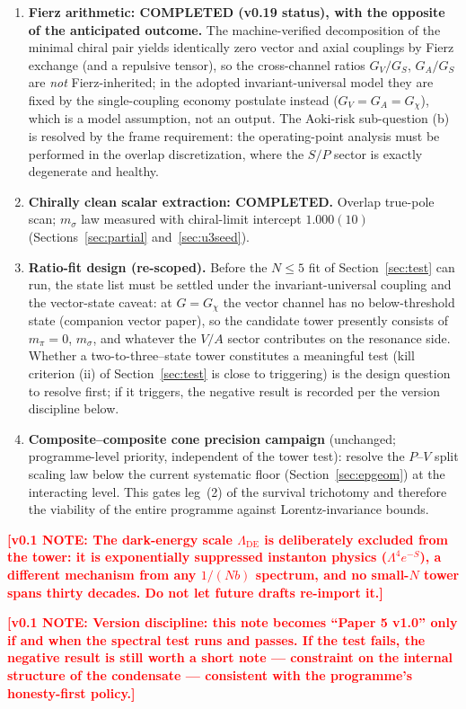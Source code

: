 \documentclass[11pt,a4paper]{article}
\newcommand{\workingnote}[1]{\textcolor{red}{\textbf{[v0.1 NOTE: #1]}}}
\begin{document}
\begin{enumerate}
\item \textbf{Fierz arithmetic: COMPLETED (v0.19 status), with the
opposite of the anticipated outcome.}  The machine-verified
decomposition of the minimal chiral pair yields identically zero
vector and axial couplings by Fierz exchange (and a repulsive
tensor), so the cross-channel ratios $G_V/G_S$, $G_A/G_S$ are
\emph{not} Fierz-inherited; in the adopted invariant-universal
model they are fixed by the single-coupling economy postulate
instead ($G_V = G_A = G_\chi$), which is a model assumption, not
an output.  The Aoki-risk sub-question (b) is resolved by the
frame requirement: the operating-point analysis must be performed
in the overlap discretization, where the $S/P$ sector is exactly
degenerate and healthy.
\item \textbf{Chirally clean scalar extraction: COMPLETED.}
Overlap true-pole scan; $m_\sigma$ law measured with chiral-limit
intercept $1.000(10)$ (Sections~\ref{sec:partial}
and~\ref{sec:u3seed}).
\item \textbf{Ratio-fit design (re-scoped).}  Before the
$N \le 5$ fit of Section~\ref{sec:test} can run, the state list
must be settled under the invariant-universal coupling and the
vector-state caveat: at $G = G_\chi$ the vector channel has no
below-threshold state (companion vector paper), so the candidate
tower presently consists of $m_\pi = 0$, $m_\sigma$, and
whatever the $V/A$ sector contributes on the resonance side.
Whether a two-to-three--state tower constitutes a meaningful test
(kill criterion (ii) of Section~\ref{sec:test} is close to
triggering) is the design question to resolve first; if it
triggers, the negative result is recorded per the version
discipline below.
\item \textbf{Composite--composite cone precision campaign}
(unchanged; programme-level priority, independent of the tower
test): resolve the $P$--$V$ split scaling law below the current
systematic floor (Section~\ref{sec:epgeom}) at the interacting
level.  This gates leg~(2) of the survival trichotomy and
therefore the viability of the entire programme against
Lorentz-invariance bounds.
\end{enumerate}

\workingnote{The dark-energy scale $\Lambda_{\mathrm{DE}}$ is
deliberately excluded from the tower: it is exponentially
suppressed instanton physics ($\Lambda^4 e^{-S}$), a different
mechanism from any $1/(Nb)$ spectrum, and no small-$N$ tower spans
thirty decades. Do not let future drafts re-import it.}

\workingnote{Version discipline: this note becomes ``Paper 5
v1.0'' only if and when the spectral test runs and passes.
If the test fails, the negative result is still worth a short
note --- constraint on the internal structure of the condensate
--- consistent with the programme's honesty-first policy.}
\end{document}
